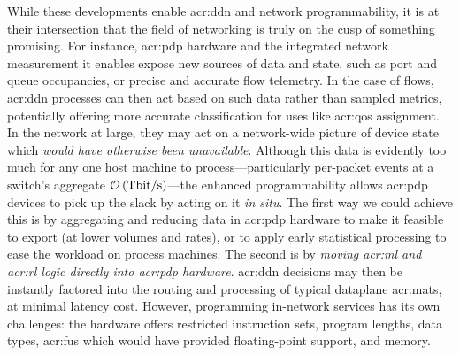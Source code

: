 
While these developments enable \gls{acr:ddn} and network programmability, it is at their intersection that the field of networking is truly on the cusp of something promising.
For instance, \gls{acr:pdp} hardware and the integrated network measurement it enables expose new sources of data and state, such as port and queue occupancies, or precise and accurate flow telemetry.
In the case of flows, \gls{acr:ddn} processes can then act based on such data rather than sampled metrics, potentially offering more accurate classification for uses like \gls{acr:qos} assignment.
In the network at large, they may act on a network-wide picture of device state which \emph{would have otherwise been unavailable}.
Although this data is evidently too much for any one host machine to process---particularly per-packet events at a switch's aggregate $\mathcal{O}\left(\unit{\tera\bit\per\second}\right)$---the enhanced programmability allows \gls{acr:pdp} devices to pick up the slack by acting on it \emph{in situ}.
The first way we could achieve this is by aggregating and reducing data in \gls{acr:pdp} hardware to make it feasible to export (at lower volumes and rates), or to apply early statistical processing to ease the workload on process machines.
The second is by \emph{moving \gls{acr:ml} and \gls{acr:rl} logic directly into \gls{acr:pdp} hardware}.
\gls{acr:ddn} decisions may then be instantly factored into the routing and processing of typical dataplane \glspl{acr:mat}, at minimal latency cost.
However, programming in-network services has its own challenges: the hardware offers restricted instruction sets, program lengths, data types, \glspl{acr:fu} which would have provided floating-point support, and memory.
